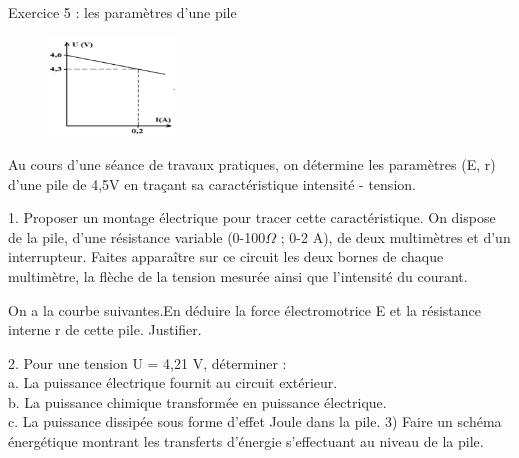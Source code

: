 \documentclass[12pt, french]{article}
\begin{document}
\begin{Box2}{Exercice 5 : les paramètres d’une pile }
\begin{figure}
  \begin{center}
     \vspace{-0.5cm}
    \includegraphics[width=0.3\textwidth]{./img/carcateristique_generateur.png}
  \end{center}
\end{figure}
  
   Au cours d’une séance de travaux pratiques, on détermine les paramètres (E, r) d’une pile de 4,5V en traçant sa
caractéristique intensité - tension.

1. Proposer un montage électrique pour tracer cette caractéristique. On dispose de la pile, d’une résistance variable (0-100$\Omega$ ; 0-2 A), de deux multimètres et d’un interrupteur.
Faites apparaître sur ce circuit les deux bornes de chaque multimètre, la flèche de la tension mesurée ainsi que
l’intensité du courant.

   On a la courbe suivantes.En déduire la force électromotrice E et la résistance interne r de cette pile. Justifier.

   2. Pour une tension U = 4,21 V, déterminer :
\\a. La puissance électrique fournit au circuit extérieur.
\\b. La puissance chimique transformée en puissance électrique.
\\c. La puissance dissipée sous forme d’effet Joule dans la pile.
3) Faire un schéma énergétique montrant les transferts d’énergie s’effectuant au niveau de la pile.
\end{Box2}
\end{document}
